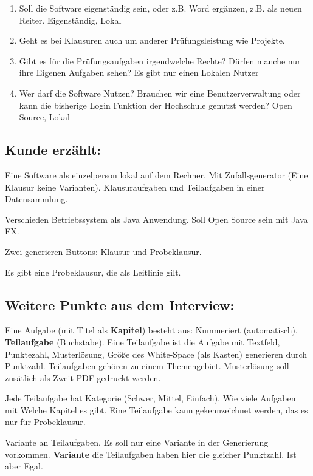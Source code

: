 \documentclass[a4paper]{article}
\begin{document}
\begin{enumerate}
    \item Soll die Software eigenständig sein, oder z.B. Word ergänzen, z.B. als neuen Reiter.
    \subitem Eigenständig, Lokal
    \item Geht es bei Klausuren auch um anderer Prüfungsleistung wie Projekte.
    \subitem 
    \item Gibt es für die Prüfungsaufgaben irgendwelche Rechte? Dürfen manche nur ihre Eigenen Aufgaben sehen?
    \subitem Es gibt nur einen Lokalen Nutzer
    \item Wer darf die Software Nutzen? Brauchen wir eine Benutzerverwaltung oder kann die bisherige Login Funktion der Hochschule genutzt werden?
    \subitem Open Source, Lokal
\end{enumerate}

\subsection{Kunde erzählt:}

Eine Software als einzelperson lokal auf dem Rechner. Mit Zufallsgenerator (Eine Klausur keine Varianten). Klausuraufgaben und Teilaufgaben in einer Datensammlung.

Verschieden Betriebssystem als Java Anwendung. Soll Open Source sein mit Java FX.

Zwei generieren Buttons: Klausur und Probeklausur.

Es gibt eine Probeklausur, die als Leitlinie gilt.


\subsection{Weitere Punkte aus dem Interview:}


Eine Aufgabe (mit Titel als \textbf{Kapitel}) besteht aus: Nummeriert (automatisch), \textbf{Teilaufgabe} (Buchstabe). Eine Teilaufgabe ist die Aufgabe mit Textfeld, Punktezahl, Musterlösung, Größe des White-Space (als Kasten) generieren durch Punktzahl. Teilaufgaben gehören zu einem Themengebiet. Musterlösung soll zusätlich als Zweit PDF gedruckt werden.

Jede Teilaufgabe hat Kategorie (Schwer, Mittel, Einfach), Wie viele Aufgaben mit Welche Kapitel es gibt. Eine Teilaufgabe kann gekennzeichnet werden, das es nur für Probeklausur.

Variante an Teilaufgaben. Es soll nur eine Variante in der Generierung vorkommen. \textbf{Variante} die Teilaufgaben haben hier die gleicher Punktzahl. Ist aber Egal.
\end{document}
